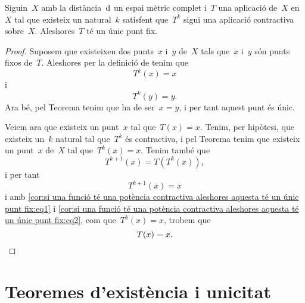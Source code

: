 \documentclass[../../main.tex]{subfiles}
\begin{document}
    \begin{corollary}
        \label{cor:si una funció té una potència contractiva aleshores aquesta té un únic punt fix}
        Siguin~\(X\) amb la distància~\(\operatorname{d}\) un espai mètric complet i~\(T\) una aplicació de~\(X\) en~\(X\) tal que existeix un natural~\(k\) satisfent que~\(T^{k}\) sigui una aplicació contractiva sobre~\(X\).
        Aleshores~\(T\) té un únic punt fix.
        \begin{proof}
            Suposem que existeixen dos punts~\(x\) i~\(y\) de~\(X\) tals que~\(x\) i~\(y\) són punts fixos de~\(T\).
            Aleshores per la definició de  tenim que
            \[
                T^{k}(x)=x
            \]
            i
            \[
                T^{k}(y)=y.
            \]
            Ara bé, pel Teorema  tenim que ha de ser~\(x=y\), i per tant aquest punt és únic.

            Veiem ara que existeix un punt~\(x\) tal que~\(T(x)=x\).
            Tenim, per hipòtesi, que existeix un~\(k\) natural tal que~\(T^{k}\) és contractiva, i pel Teorema  tenim que existeix un punt~\(x\) de~\(X\) tal que~\(T^{k}(x)=x\).
            Tenim també que
            \begin{equation}
                \label{cor:si una funció té una potència contractiva aleshores aquesta té un únic punt fix:eq1}
                T^{k+1}(x)=T(T^{k}(x)),
            \end{equation}
            i per tant
            \begin{equation}
                \label{cor:si una funció té una potència contractiva aleshores aquesta té un únic punt fix:eq2}
                T^{k+1}(x)=x
            \end{equation}
            i amb \eqref{cor:si una funció té una potència contractiva aleshores aquesta té un únic punt fix:eq1} i \eqref{cor:si una funció té una potència contractiva aleshores aquesta té un únic punt fix:eq2}, com que~\(T^{k}(x)=x\), trobem que
            \[
                T(x)=x.\qedhere
            \]
        \end{proof}
    \end{corollary}
\section{Teoremes d'existència i unicitat}
\end{document}

